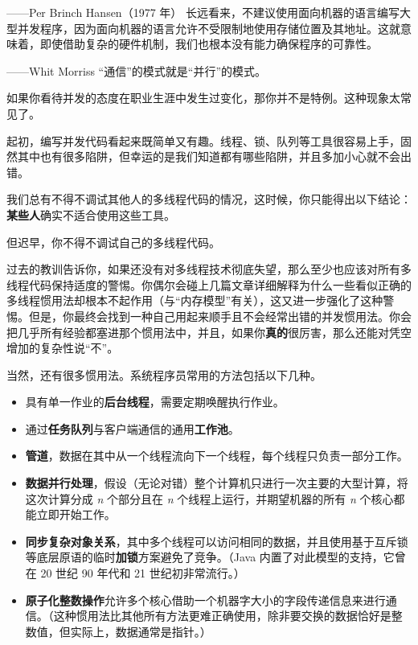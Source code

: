 
\begin{myEpigraph}{——Per Brinch Hansen（1977 年）}
长远看来，不建议使用面向机器的语言编写大型并发程序，因为面向机器的语言允许不受限制地使用存储位置及其地址。这就意味着，即使借助复杂的硬件机制，我们也根本没有能力确保程序的可靠性。
\end{myEpigraph}

\begin{myEpigraph}{——Whit Morriss}
“通信”的模式就是“并行”的模式。
\end{myEpigraph}

如果你看待并发的态度在职业生涯中发生过变化，那你并不是特例。这种现象太常见了。

起初，编写并发代码看起来既简单又有趣。线程、锁、队列等工具很容易上手，固然其中也有很多陷阱，但幸运的是我们知道都有哪些陷阱，并且多加小心就不会出错。

我们总有不得不调试其他人的多线程代码的情况，这时候，你只能得出以下结论：\textbf{某些人}确实不适合使用这些工具。

但迟早，你不得不调试自己的多线程代码。

过去的教训告诉你，如果还没有对多线程技术彻底失望，那么至少也应该对所有多线程代码保持适度的警惕。你偶尔会碰上几篇文章详细解释为什么一些看似正确的多线程惯用法却根本不起作用（与“内存模型”有关），这又进一步强化了这种警惕。但是，你最终会找到一种自己用起来顺手且不会经常出错的并发惯用法。你会把几乎所有经验都塞进那个惯用法中，并且，如果你\textbf{真的}很厉害，那么还能对凭空增加的复杂性说“不”。

当然，还有很多惯用法。系统程序员常用的方法包括以下几种。

\begin{itemize}
\item 具有单一作业的\textbf{后台线程}，需要定期唤醒执行作业。
\item 通过\textbf{任务队列}与客户端通信的通用\textbf{工作池}。
\item \textbf{管道}，数据在其中从一个线程流向下一个线程，每个线程只负责一部分工作。
\item \textbf{数据并行处理}，假设（无论对错）整个计算机只进行一次主要的大型计算，将这次计算分成 \emph{n} 个部分且在 \emph{n} 个线程上运行，并期望机器的所有 \emph{n} 个核心都能立即开始工作。
\item \textbf{同步复杂对象关系}，其中多个线程可以访问相同的数据，并且使用基于互斥锁等底层原语的临时\textbf{加锁}方案避免了竞争。（Java 内置了对此模型的支持，它曾在 20 世纪 90 年代和 21 世纪初非常流行。）
\item \textbf{原子化整数操作}允许多个核心借助一个机器字大小的字段传递信息来进行通信。（这种惯用法比其他所有方法更难正确使用，除非要交换的数据恰好是整数值，但实际上，数据通常是指针。）
\end{itemize}


